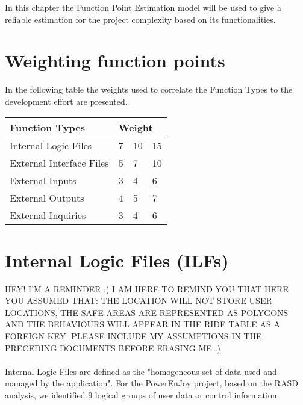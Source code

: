 In this chapter the Function Point Estimation model will be used to give a reliable estimation for the project complexity based
on its functionalities.


\section{Weighting function points} \label{sec:weights}
In the following table the weights used to correlate the Function Types to the development effort are presented.

\begin{center}
  \begin{tabular}{ |l|l|l|l| }
    \hline
    Function Types & \multicolumn{3}{l|}{Weight} \\ \hline
    Internal Logic Files & 7 & 10 & 15 \\ \hline
    External Interface Files & 5 & 7 & 10 \\ \hline
    External Inputs & 3 & 4 & 6 \\ \hline
    External Outputs & 4 & 5 & 7 \\ \hline
    External Inquiries & 3 & 4 & 6 \\ \hline
  \end{tabular}
\end{center}


\newpage
\section{Internal Logic Files (ILFs)}
HEY! I'M A REMINDER :) I AM HERE TO REMIND YOU THAT HERE YOU ASSUMED THAT: THE LOCATION WILL NOT STORE USER LOCATIONS, THE SAFE AREAS ARE REPRESENTED AS POLYGONS AND THE BEHAVIOURS WILL APPEAR IN THE RIDE TABLE AS A FOREIGN KEY. PLEASE INCLUDE MY ASSUMPTIONS IN THE PRECEDING DOCUMENTS BEFORE ERASING ME :)
\\ \\
Internal Logic Files are defined as the "homogeneous set of data used and managed by the application". For the PowerEnJoy project, based on the RASD analysis, we identified 9 logical groups of user data or control information: \\

